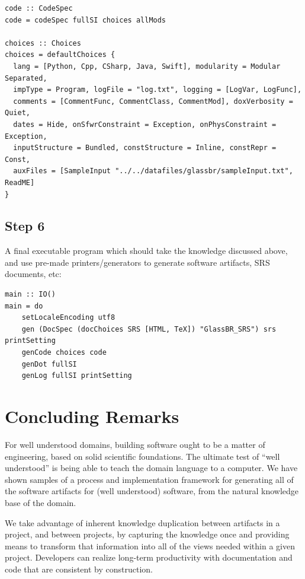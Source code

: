 \documentclass[sigconf,review]{acmart}
\begin{document}
\begin{lstlisting}
code :: CodeSpec
code = codeSpec fullSI choices allMods

choices :: Choices
choices = defaultChoices {
  lang = [Python, Cpp, CSharp, Java, Swift], modularity = Modular Separated,
  impType = Program, logFile = "log.txt", logging = [LogVar, LogFunc],
  comments = [CommentFunc, CommentClass, CommentMod], doxVerbosity = Quiet,
  dates = Hide, onSfwrConstraint = Exception, onPhysConstraint = Exception,
  inputStructure = Bundled, constStructure = Inline, constRepr = Const,
  auxFiles = [SampleInput "../../datafiles/glassbr/sampleInput.txt", ReadME] 
}
\end{lstlisting}

\subsection*{Step 6}

A final executable program which should take the knowledge discussed above, and
use pre-made printers/generators to generate software artifacts, SRS documents,
etc:

\begin{lstlisting}
main :: IO()
main = do
    setLocaleEncoding utf8
    gen (DocSpec (docChoices SRS [HTML, TeX]) "GlassBR_SRS") srs printSetting
    genCode choices code
    genDot fullSI
    genLog fullSI printSetting
\end{lstlisting}

\section{Concluding Remarks} \label{ch:concluding_remarks}

For well understood domains, building software ought to be a matter of
engineering, based on solid scientific foundations. The ultimate test of ``well
understood'' is being able to teach the domain language to a computer. We have
shown samples of a process and implementation framework for generating all of
the software artifacts for (well understood) software, from the natural
knowledge base of the domain.

We take advantage of inherent knowledge duplication between artifacts in a
project, and between projects, by capturing the knowledge once and providing
means to transform that information into all of the views needed within a given
project.  Developers can realize long-term productivity with documentation and
code that are consistent by construction.
\end{document}
